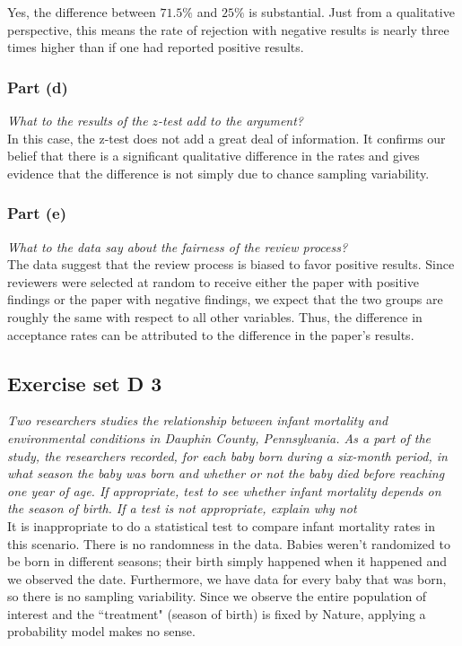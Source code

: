 \documentclass[11pt]{article}
\begin{document}
Yes, the difference between $71.5\%$ and $25\%$ is substantial.  Just from a qualitative perspective, this means the rate of rejection with negative results is nearly three times higher than if one had reported positive results.


\subsubsection*{Part (d)}
\textit{What to the results of the $z$-test add to the argument?}\\

In this case, the z-test does not add a great deal of information.  It confirms our belief that there is a significant qualitative difference in the rates and gives evidence that the difference is not simply due to chance sampling variability.

\subsubsection*{Part (e)}
\textit{What to the data say about the fairness of the review process?}\\

The data suggest that the review process is biased to favor positive results.  Since reviewers were selected at random to receive either the paper with positive findings or the paper with negative findings, we expect that the two groups are roughly the same with respect to all other variables.  Thus, the difference in acceptance rates can be attributed to the difference in the paper's results.

\subsection*{Exercise set D 3} %
\textit{Two researchers studies the relationship between infant mortality and environmental conditions in Dauphin County, Pennsylvania. As a part of the study, the researchers recorded, for each baby born during a six-month period, in what season the baby was born and whether or not the baby died before reaching one year of age. If appropriate, test to see whether  infant mortality depends on the season of birth. If a test is not appropriate, explain why not}\\

It is inappropriate to do a statistical test to compare infant mortality rates in this scenario.  There is no randomness in the data.  Babies weren't randomized to be born in different seasons; their birth simply happened when it happened and we observed the date.  Furthermore, we have data for every baby that was born, so there is no sampling variability.  Since we observe the entire population of interest and the ``treatment" (season of birth) is fixed by Nature, applying a probability model makes no sense.
\end{document}
